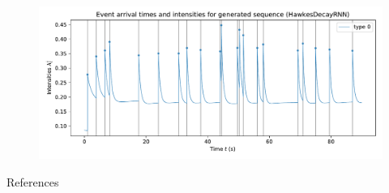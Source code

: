 \documentclass{beamer}
\begin{document}
\begin{frame}
\begin{figure}
	\includegraphics[width=\linewidth]{../results/intensity_HawkesDecayRNN_1d_hidden64_20181206-234848.pdf}
	\caption{}
\end{figure}
\end{frame}

\begin{frame}[t,allowframebreaks]{References}
	\printbibliography
\end{frame}
\end{document}
